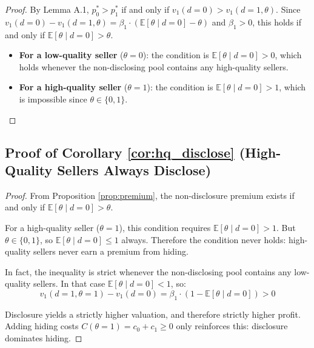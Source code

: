 \documentclass[10pt,letterpaper]{bp-template-concise}
\begin{document}
\begin{proof}
By Lemma A.1, $p^*_0 > p^*_1$ if and only if $v_1(d=0) > v_1(d=1, \theta)$. Since $v_1(d=0) - v_1(d=1, \theta) = \beta_1 \cdot (\mathbb{E}[\theta \mid d=0] - \theta)$ and $\beta_1 > 0$, this holds if and only if $\mathbb{E}[\theta \mid d=0] > \theta$.

\begin{itemize}
    \item \textbf{For a low-quality seller} ($\theta = 0$): the condition is $\mathbb{E}[\theta \mid d=0] > 0$, which holds whenever the non-disclosing pool contains any high-quality sellers.
    \item \textbf{For a high-quality seller} ($\theta = 1$): the condition is $\mathbb{E}[\theta \mid d=0] > 1$, which is impossible since $\theta \in \{0,1\}$.
\end{itemize}
\end{proof}

\subsection*{Proof of Corollary \ref{cor:hq_disclose} (High-Quality Sellers Always Disclose)}

\begin{proof}
From Proposition \ref{prop:premium}, the non-disclosure premium exists if and only if $\mathbb{E}[\theta \mid d=0] > \theta$.

For a high-quality seller ($\theta = 1$), this condition requires $\mathbb{E}[\theta \mid d=0] > 1$. But $\theta \in \{0, 1\}$, so $\mathbb{E}[\theta \mid d=0] \leq 1$ always. Therefore the condition never holds: high-quality sellers never earn a premium from hiding.

In fact, the inequality is strict whenever the non-disclosing pool contains any low-quality sellers. In that case $\mathbb{E}[\theta \mid d=0] < 1$, so:
\begin{equation}
    v_1(d=1, \theta=1) - v_1(d=0) = \beta_1 \cdot (1 - \mathbb{E}[\theta \mid d=0]) > 0
\end{equation}

Disclosure yields a strictly higher valuation, and therefore strictly higher profit. Adding hiding costs $C(\theta=1) = c_0 + c_1 \geq 0$ only reinforces this: disclosure dominates hiding.
\end{proof}

\end{document}
